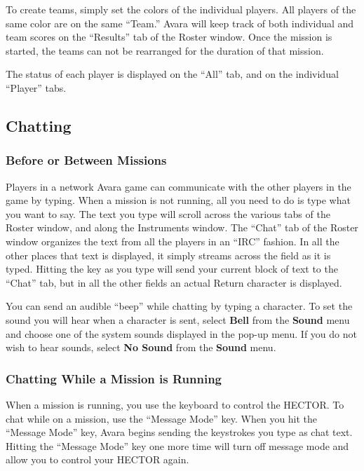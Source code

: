 \documentclass{article}
\begin{document}
To create teams, simply set the colors of the individual players. All players of the same color are on the same ``Team.'' Avara will keep track of both individual and team scores on the ``Results'' tab of the Roster window. Once the mission is started, the teams can not be rearranged for the duration of that mission.

The status of each player is displayed on the ``All'' tab, and on the individual ``Player'' tabs.

\subsection{Chatting}
\subsubsection{Before or Between Missions}
Players in a network Avara game can communicate with the other players in the game by typing. When a mission is not running, all you need to do is type what you want to say. The text you type will scroll across the various tabs of the Roster window, and along the Instruments window. The ``Chat'' tab of the Roster window organizes the text from all the players in an ``IRC'' fashion. In all the other places that text is displayed, it simply streams across the field as it is typed. Hitting the \textbf{} key as you type will send your current block of text to the ``Chat'' tab, but in all the other fields an actual Return character is displayed.

You can send an audible ``beep'' while chatting by typing a \textbf{} character. To set the sound you will hear when a \textbf{} character is sent, select \textbf{Bell } from the \textbf{Sound} menu and choose one of the system sounds displayed in the pop-up menu. If you do not wish to hear \textbf{} sounds, select \textbf{No Sound} from the \textbf{Sound} menu.

\subsubsection{Chatting While a Mission is Running}
When a mission is running, you use the keyboard to control the HECTOR. To chat while on a mission, use the ``Message Mode'' key. When you hit the ``Message Mode'' key, Avara begins sending the keystrokes you type as chat text. Hitting the ``Message Mode'' key one more time will turn off message mode and allow you to control your HECTOR again.
\end{document}
